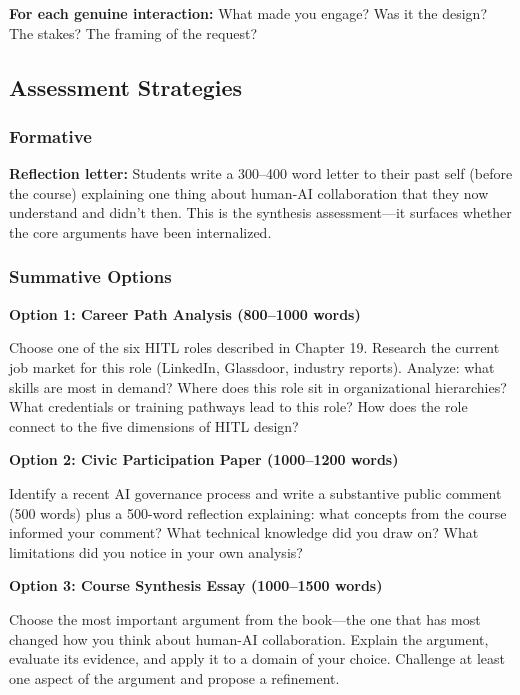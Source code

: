 \textbf{For each genuine interaction:} What made you engage? Was it the design? The stakes? The framing of the request?

\subsection*{Assessment Strategies}

\subsubsection*{Formative}

\textbf{Reflection letter:} Students write a 300--400 word letter to their past self (before the course) explaining one thing about human-AI collaboration that they now understand and didn't then. This is the synthesis assessment---it surfaces whether the core arguments have been internalized.

\subsubsection*{Summative Options}

\textbf{Option 1: Career Path Analysis (800--1000 words)}

Choose one of the six HITL roles described in Chapter 19. Research the current job market for this role (LinkedIn, Glassdoor, industry reports). Analyze: what skills are most in demand? Where does this role sit in organizational hierarchies? What credentials or training pathways lead to this role? How does the role connect to the five dimensions of HITL design?

\textbf{Option 2: Civic Participation Paper (1000--1200 words)}

Identify a recent AI governance process and write a substantive public comment (500 words) plus a 500-word reflection explaining: what concepts from the course informed your comment? What technical knowledge did you draw on? What limitations did you notice in your own analysis?

\textbf{Option 3: Course Synthesis Essay (1000--1500 words)}

Choose the most important argument from the book---the one that has most changed how you think about human-AI collaboration. Explain the argument, evaluate its evidence, and apply it to a domain of your choice. Challenge at least one aspect of the argument and propose a refinement.

